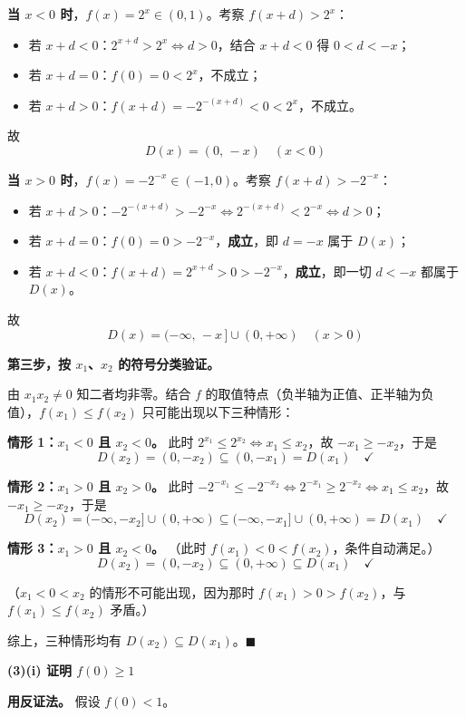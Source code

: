\textbf{当 $x<0$ 时}，$f(x)=2^x\in(0,1)$。考察 $f(x+d)>2^x$：
\begin{itemize}
\item 若 $x+d<0$：$2^{x+d}>2^{x}\iff d>0$，结合 $x+d<0$ 得 $0<d<-x$；
\item 若 $x+d=0$：$f(0)=0<2^x$，不成立；
\item 若 $x+d>0$：$f(x+d)=-2^{-(x+d)}<0<2^{x}$，不成立。
\end{itemize}

故
\[\boxed{D(x)=(0,\,-x)\quad(x<0)}\]

\textbf{当 $x>0$ 时}，$f(x)=-2^{-x}\in(-1,0)$。考察 $f(x+d)>-2^{-x}$：
\begin{itemize}
\item 若 $x+d>0$：$-2^{-(x+d)}>-2^{-x}\iff 2^{-(x+d)}<2^{-x}\iff d>0$；
\item 若 $x+d=0$：$f(0)=0>-2^{-x}$，\textbf{成立}，即 $d=-x$ 属于 $D(x)$；
\item 若 $x+d<0$：$f(x+d)=2^{x+d}>0>-2^{-x}$，\textbf{成立}，即一切 $d<-x$ 都属于 $D(x)$。
\end{itemize}

故
\[\boxed{D(x)=(-\infty,\,-x\,]\cup(0,+\infty)\quad(x>0)}\]

\textbf{第三步，按 $x_1$、$x_2$ 的符号分类验证。}

由 $x_1x_2\ne0$ 知二者均非零。结合 $f$ 的取值特点（负半轴为正值、正半轴为负值），$f(x_1)\le f(x_2)$ 只可能出现以下三种情形：

\textbf{情形 1：$x_1<0$ 且 $x_2<0$。}
此时 $2^{x_1}\le2^{x_2}\iff x_1\le x_2$，故 $-x_1\ge-x_2$，于是
\[D(x_2)=(0,-x_2)\subseteq(0,-x_1)=D(x_1)\quad\checkmark\]

\textbf{情形 2：$x_1>0$ 且 $x_2>0$。}
此时 $-2^{-x_1}\le-2^{-x_2}\iff 2^{-x_1}\ge2^{-x_2}\iff x_1\le x_2$，故 $-x_1\ge-x_2$，于是
\[D(x_2)=(-\infty,-x_2]\cup(0,+\infty)\subseteq(-\infty,-x_1]\cup(0,+\infty)=D(x_1)\quad\checkmark\]

\textbf{情形 3：$x_1>0$ 且 $x_2<0$。}
（此时 $f(x_1)<0<f(x_2)$，条件自动满足。）
\[D(x_2)=(0,-x_2)\subseteq(0,+\infty)\subseteq D(x_1)\quad\checkmark\]

（$x_1<0<x_2$ 的情形不可能出现，因为那时 $f(x_1)>0>f(x_2)$，与 $f(x_1)\le f(x_2)$ 矛盾。）

综上，三种情形均有 $D(x_2)\subseteq D(x_1)$。$\blacksquare$

\par\medskip

\textbf{(3)(i) 证明 $f(0)\ge1$}

\textbf{用反证法。} 假设 $f(0)<1$。

